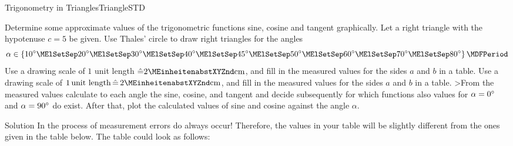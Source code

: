\begin{MXContent}{Trigonometry in Triangles}{Triangle}{STD}
\begin{MExercise}
Determine some approximate values of the trigonometric functions sine, cosine 
and tangent graphically. Let a right triangle with the hypotenuse $c=5$ be given. 
Use Thales' circle to draw right triangles for the angles
\[ 
\alpha \in \left\{10\MGrad\MElSetSep 20\MGrad\MElSetSep %
30\MGrad\MElSetSep 40\MGrad\MElSetSep 45\MGrad\MElSetSep 50\MGrad\MElSetSep %
60\MGrad\MElSetSep 70\MGrad\MElSetSep 80\MGrad \right\} \MDFPeriod %
\]
\ifttm
Use a drawing scale of $1$ unit length $\hat{=} 2\MEinheit{cm}$, and fill in the 
measured values for the sides $a$ and $b$ in a table. 
\else
Use a drawing scale of $1\,\text{unit length} \,\hat{=}\, 2\MEinheit{cm}$, and fill in the 
measured values for the sides $a$ and $b$ in a table. 
\fi
>From the measured values calculate to each angle the sine, cosine, and tangent 
and decide subsequently for which functions also values for $\alpha = 0^{\circ}$ 
and $\alpha = 90^{\circ}$ do exist. After that, plot the calculated values of sine 
and cosine against the angle $\alpha$.

\begin{MHint}{Solution}
In the process of measurement errors do always occur! Therefore, the 
values in your table will be slightly different from the ones given in 
the table below. The table could look as follows:


\end{MHint}
\end{MExercise}
\end{MXContent}
